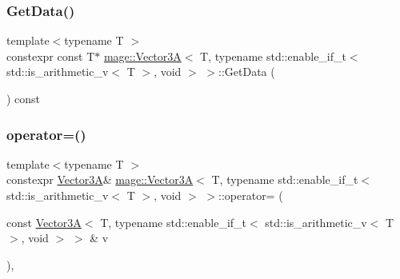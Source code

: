 \subsubsection{\texorpdfstring{Get\+Data()}{GetData()}\hspace{0.1cm}{\footnotesize\ttfamily [2/2]}}
{\footnotesize\ttfamily template$<$typename T $>$ \\
constexpr const T$\ast$ \hyperlink{structmage_1_1_vector3_a}{mage\+::\+Vector3A}$<$ T, typename std\+::enable\+\_\+if\+\_\+t$<$ std\+::is\+\_\+arithmetic\+\_\+v$<$ T $>$, void $>$ $>$\+::Get\+Data (\begin{DoxyParamCaption}{ }\end{DoxyParamCaption}) const\hspace{0.3cm}{\ttfamily [noexcept]}}

\hypertarget{structmage_1_1_vector3_a_3_01_t_00_01typename_01std_1_1enable__if__t_3_01std_1_1is__arithmetic__7070ab83646a86866d1e3c9d7eeea37a_ae3ff2b65536938b9a5ddef3b75dfdbf9}{}\label{structmage_1_1_vector3_a_3_01_t_00_01typename_01std_1_1enable__if__t_3_01std_1_1is__arithmetic__7070ab83646a86866d1e3c9d7eeea37a_ae3ff2b65536938b9a5ddef3b75dfdbf9} 
\subsubsection{\texorpdfstring{operator=()}{operator=()}\hspace{0.1cm}{\footnotesize\ttfamily [1/2]}}
{\footnotesize\ttfamily template$<$typename T $>$ \\
constexpr \hyperlink{structmage_1_1_vector3_a}{Vector3A}\& \hyperlink{structmage_1_1_vector3_a}{mage\+::\+Vector3A}$<$ T, typename std\+::enable\+\_\+if\+\_\+t$<$ std\+::is\+\_\+arithmetic\+\_\+v$<$ T $>$, void $>$ $>$\+::operator= (\begin{DoxyParamCaption}\item[{const \hyperlink{structmage_1_1_vector3_a}{Vector3A}$<$ T, typename std\+::enable\+\_\+if\+\_\+t$<$ std\+::is\+\_\+arithmetic\+\_\+v$<$ T $>$, void $>$ $>$ \&}]{v }\end{DoxyParamCaption})\hspace{0.3cm}{\ttfamily [default]}, {\ttfamily [noexcept]}}

